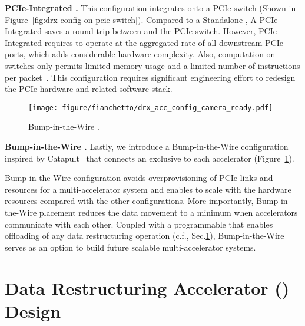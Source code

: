 \noindent\textbf{PCIe-Integrated \drx.}
This configuration integrates \drx onto a PCIe switch (Shown in Figure~\ref{fig:drx-config-on-pcie-switch}).
%
Compared to a Standalone \drx, A PCIe-Integrated \drx saves a round-trip between \drx and the PCIe switch.  
%
However, PCIe-Integrated \drx requires \drx to operate at the aggregated rate of all downstream PCIe ports, which adds considerable hardware complexity. 
%
Also, computation on switches only permits limited memory usage and a limited number of instructions per packet~\cite{rmt:sigcomm:2013,drmt:sigcomm:2017,in-network-compute:hotnets:2017,in-network-compute:eurosys:2019}. 
%
This configuration requires significant engineering effort to redesign the PCIe hardware and related software stack. 

\begin{figure}[ht!]
    \centering
    \texttt{[image: figure/fianchetto/drx\_acc\_config\_camera\_ready.pdf]}
    \caption{Bump-in-the-Wire \drx.
    }
    \label{fig:drx-config-acc}
\end{figure}

\noindent\textbf{Bump-in-the-Wire \drx.}
Lastly, we introduce a Bump-in-the-Wire \drx configuration 
inspired by Catapult~\cite{catapult:isca:2014} that connects an exclusive \drx to each accelerator (Figure~\ref{fig:drx-config-acc}).

Bump-in-the-Wire configuration avoids overprovisioning of PCIe links and \drx resources for a multi-accelerator system and enables \dmx to scale with the hardware resources compared with the other configurations.
%
More importantly, Bump-in-the-Wire \drx placement reduces the data movement to a minimum when accelerators communicate with each other.
%
%
Coupled with a programmable \drx that enables offloading of any data restructuring operation (c.f., Sec.\ref{sec:accelerator}), Bump-in-the-Wire \drx serves as an option to build future scalable multi-accelerator systems.


\section{Data Restructuring Accelerator (\drx) Design}
\label{sec:accelerator}

